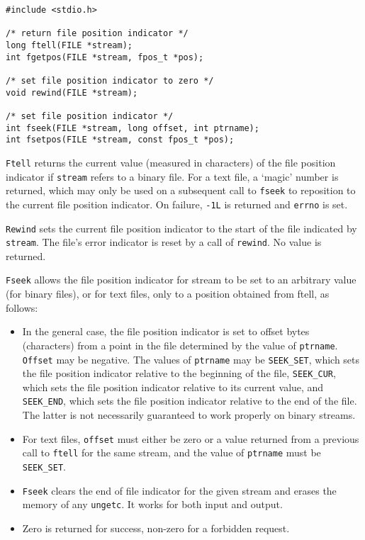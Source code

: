   \begin{Verbatim}
#include <stdio.h>

/* return file position indicator */
long ftell(FILE *stream);
int fgetpos(FILE *stream, fpos_t *pos);

/* set file position indicator to zero */
void rewind(FILE *stream);

/* set file position indicator */
int fseek(FILE *stream, long offset, int ptrname);
int fsetpos(FILE *stream, const fpos_t *pos);
\end{Verbatim}

  \texttt{Ftell} returns the current value (measured in characters)  of
   the  file  position  indicator  if \texttt{stream} refers to a binary
   file.  For a text file, a `magic' number is returned,  which may only
   be used on a subsequent call to \texttt{fseek} to reposition to the
   current file position indicator.  On failure, \texttt{-1L}  is returned
   and \texttt{errno} is set.


  \texttt{Rewind} sets the current file position indicator to the start
   of the file indicated by \texttt{stream}.  The file's error indicator is
   reset by a call of \texttt{rewind}.  No value is returned.


  \texttt{Fseek} allows the file position indicator for  stream  to  be
   set  to  an  arbitrary value (for binary files), or for text files, only to
   a position obtained from ftell, as follows:


  \begin{itemize}
   \item In the general case, the file position indicator is set
    to  offset  bytes (characters) from a point in the file
    determined by the value  of  \texttt{ptrname}.   \texttt{Offset}
    may  be negative.  The values of \texttt{ptrname} may be
    \texttt{SEEK\_SET}, which sets the file position indicator relative
    to the beginning of the file, \texttt{SEEK\_CUR}, which sets the file
    position indicator relative to its current  value,  and
    \texttt{SEEK\_END},   which  sets  the  file  position  indicator
    relative to the end of the file.   The  latter  is  not
    necessarily  guaranteed  to  work  properly  on  binary
    streams.

   \item For text files, \texttt{offset} must either be zero or  a  value
    returned  from  a  previous  call to \texttt{ftell} for the same
    stream, and the value of \texttt{ptrname} must be
    \texttt{SEEK\_SET}.

   \item \texttt{Fseek} clears the end of file indicator  for  the  given
    stream  and  erases the memory of any \texttt{ungetc}.  It works
    for both input and output.

   \item Zero is returned for success, non-zero for a  forbidden
    request.
  \end{itemize}

